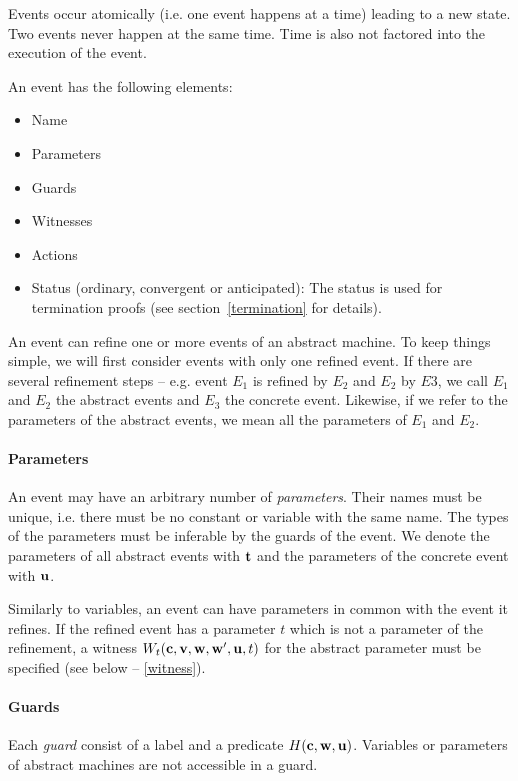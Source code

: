 Events occur atomically (i.e. one event happens at a time) leading to a new state.
Two events never happen at the same time. Time is also not factored into the execution of the event.

An event has the following elements:
\begin{itemize}
\item Name
\item Parameters
\item Guards
\item Witnesses
\item Actions
\item Status (ordinary, convergent or anticipated): The status is used
  for termination proofs (see section~\ref{termination} for details).
\end{itemize}

An event can refine one or more events of an abstract machine. To keep things simple, we will
  first consider events with only one refined event.
If there are several refinement steps -- e.g. event $E_1$ is refined by $E_2$ and $E_2$ by
  $E3$, we call $E_1$ and $E_2$ the abstract events and $E_3$ the concrete event.
Likewise, if we refer to the parameters of the abstract events, we mean all the parameters
  of $E_1$ and $E_2$.

\paragraph{Parameters}
\label{parameters}
An event may have an arbitrary number of \emph{parameters}. Their names must be unique, i.e. there must be no constant or variable with the same name.
The types of the parameters must be inferable by the guards of the event.
We denote the parameters of all abstract events with $\mathbf{t}$ and the
parameters of the concrete event with $\mathbf{u}$.

Similarly to variables, an event can have parameters in common with the event it refines.
If the refined event has a parameter $t$ which is not a parameter of the refinement, 
 a witness $W_t(\mathbf{c},{\mathbf{v},\mathbf{w}},\mathbf{w}',\mathbf{u},t)$ for
 the abstract parameter must be specified (see below -- \ref{witness}).

\paragraph{Guards}
\label{guards}
Each \emph{guard} consist of a label and a predicate $H(\mathbf{c},\mathbf{w},\mathbf{u})$.
Variables or parameters of abstract machines are not accessible in a guard.

